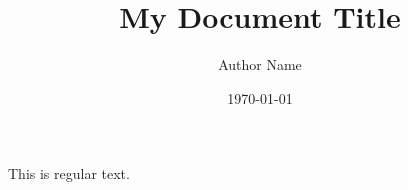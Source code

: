 \documentclass{article}
\title{My Document Title}
\author{Author Name}
\date{\today}
\begin{document}
\maketitle
This is regular text.
\end{document}
